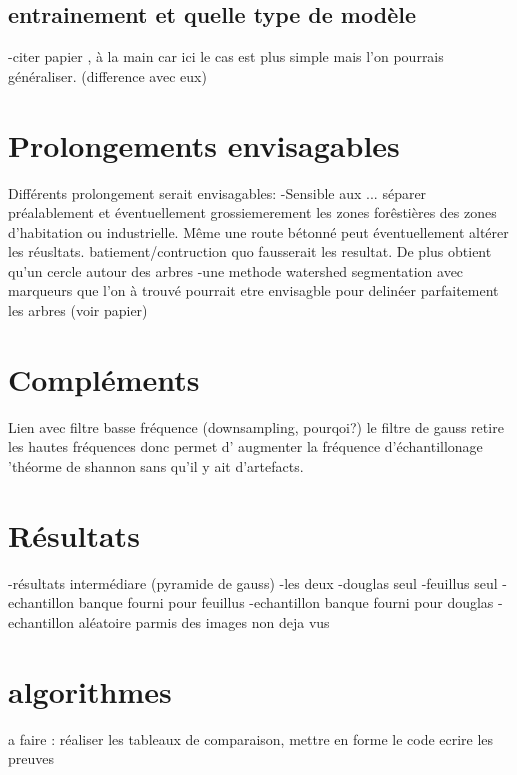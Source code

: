 \documentclass{article}
\begin{document}
	\subsection{entrainement et quelle type de modèle }
		-citer papier , à la main car ici le cas est plus simple mais l'on pourrais généraliser. (difference avec eux)

\section{Prolongements envisagables}

	Différents prolongement serait envisagables: 
	-Sensible aux ... séparer préalablement et éventuellement grossiemerement les zones forêstières des zones d'habitation ou  industrielle. Même une route bétonné peut éventuellement altérer les réusltats. batiement/contruction quo fausserait les resultat. 
	De plus obtient qu'un cercle autour des arbres
	-une methode watershed segmentation avec marqueurs que l'on à trouvé pourrait etre envisagble pour delinéer parfaitement les arbres (voir papier) 

\nocite{NatesanResNet} %



\begin{appendix}

	\section{Compléments}
		Lien avec filtre basse fréquence (downsampling, pourqoi?)
		le filtre de gauss retire les hautes fréquences donc permet d' augmenter la fréquence d'échantillonage 'théorme de shannon sans qu'il y ait d'artefacts. 
	
	\section{Résultats}	
		-résultats intermédiare (pyramide de gauss)
		-les deux 
		-douglas seul 
		-feuillus seul
		-echantillon banque fourni pour feuillus
		-echantillon banque fourni pour douglas 
		-echantillon aléatoire parmis des images non deja vus
	
	\section{algorithmes}
\end{appendix}


a faire : réaliser les tableaux de comparaison, mettre en forme le code 
ecrire les preuves 
\end{document}
